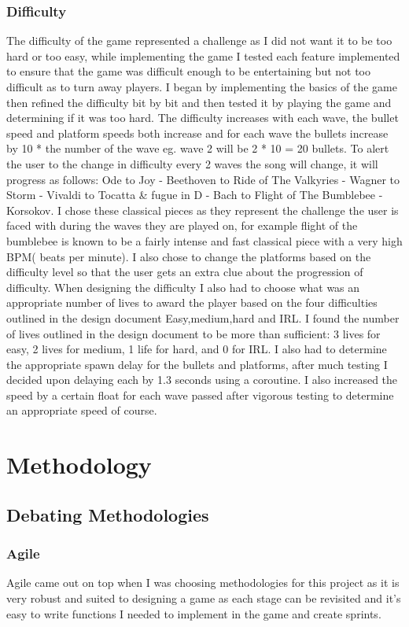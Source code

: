 \documentclass{report}
\begin{document}
\subsection{Difficulty}
The difficulty of the game represented a challenge as I did not want it to be too hard or too easy, while implementing the game I tested each feature implemented to ensure that the game was difficult enough to be entertaining but not too difficult as to turn away players.  I began by implementing the basics of the game then refined the difficulty bit by bit and then tested it by playing the game and determining if it was too hard.  The difficulty increases with each wave, the bullet speed and platform speeds both increase and for each wave the bullets increase by 10 * the number of the wave eg. wave 2 will be 2 * 10 = 20 bullets.  To alert the user to the change in difficulty every 2 waves the song will change, it will progress as follows: Ode to Joy - Beethoven\cite{Beethoven} to Ride of The Valkyries - Wagner\cite{Wagner} to Storm - Vivaldi\cite{Vivaldi} to Tocatta \& fugue in D  - Bach\cite{Bach} to Flight of The Bumblebee - Korsokov\cite{Korsokov}.  I chose these classical pieces as they represent the challenge the user is faced with during the waves they are played on, for example flight of the bumblebee is known to be a fairly intense and fast classical piece with a very high BPM( beats per minute).  I also chose to change the platforms based on the difficulty level so that the user gets an extra clue about the progression of difficulty.  When designing the difficulty I also had to choose what was an appropriate number of lives to award the player based on the four difficulties outlined in the design document Easy,medium,hard and IRL.  I found the number of lives outlined in the design document to be more than sufficient: 3 lives for easy, 2 lives for medium, 1 life for hard, and 0 for IRL.  I also had to determine the appropriate spawn delay for the bullets and platforms, after much testing I decided upon delaying each by 1.3 seconds using a coroutine. I also increased the speed by a certain float for each wave passed after vigorous testing to determine an appropriate speed of course.
\chapter{Methodology}
\section{Debating Methodologies}
\subsection{Agile}
Agile came out on top when I was choosing methodologies for this project as it is very robust and suited to designing a game as each stage can be revisited and it's easy to write functions I needed to implement in the game and create sprints.
\end{document}
